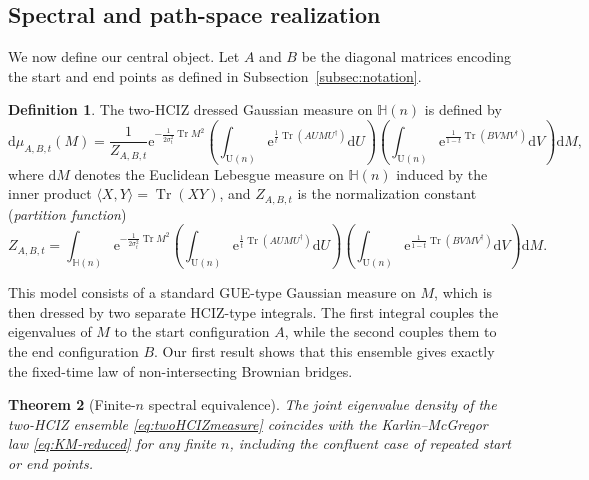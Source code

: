 \documentclass[11pt,a4paper]{article}
\newtheorem{theorem}{Theorem}[section]
\theoremstyle{definition}\newtheorem{definition}[theorem]{Definition}
\theoremstyle{remark}\newtheorem{remark}[theorem]{Remark}
\numberwithin{equation}{section}
\DeclareMathOperator{\Tr}{Tr}
\newcommand{\e}{\mathrm{e}}
\newcommand{\dd}{\mathrm{d}}
\newcommand{\HH}{\mathbb{H}(n)}
\newcommand{\UU}{\mathrm{U}(n)}
\begin{document}
\subsection{Spectral and path-space realization}
We now define our central object. Let $A$ and $B$ be the diagonal matrices encoding the start and end points as defined in Subsection~\ref{subsec:notation}.

\begin{definition} 
The two-HCIZ dressed Gaussian measure on $\HH$ is defined by
\begin{equation}
\label{eq:twoHCIZmeasure}
\dd\mu_{A,B,t}(M) = \frac{1}{Z_{A,B,t}} \e^{-\frac{1}{2\sigma_t^2}\Tr M^2} \left(\int_{\UU}\e^{\frac{1}{t}\Tr(AUMU^\dagger)}\dd U\right) \left(\int_{\UU}\e^{\frac{1}{1-t}\Tr(BVMV^\dagger)}\dd V\right) \dd M,
\end{equation}
where $\dd M$ denotes the Euclidean Lebesgue measure on $\HH$ induced by the inner product $\langle X,Y\rangle=\Tr(XY)$,  and $Z_{A,B,t}$ is the normalization constant (\textit{partition function})
\begin{equation}
 Z_{A,B,t}=\int_{\HH} \e^{-\frac{1}{2\sigma_t^2}\Tr M^2} \left(\int_{\UU}\e^{\frac{1}{t}\Tr(AUMU^\dagger)}\dd U\right) \left(\int_{\UU}\e^{\frac{1}{1-t}\Tr(BVMV^\dagger)}\dd V\right) \dd M.
\end{equation}
\end{definition}
This model consists of a standard GUE-type Gaussian measure on $M$, which is then dressed by two separate HCIZ-type integrals. The first integral couples the eigenvalues of $M$ to the start configuration $A$, while the second couples them to the end configuration $B$. Our first result shows that this ensemble gives exactly the fixed-time law of non-intersecting Brownian bridges.


 

\begin{theorem}[Finite-$n$ spectral equivalence]
\label{thm:KM-equivalence}
The joint eigenvalue density of the two-HCIZ ensemble \eqref{eq:twoHCIZmeasure} coincides with the Karlin--McGregor law \eqref{eq:KM-reduced} for any finite $n$, including the confluent case of repeated start or end points.
\end{theorem}
\end{document}
